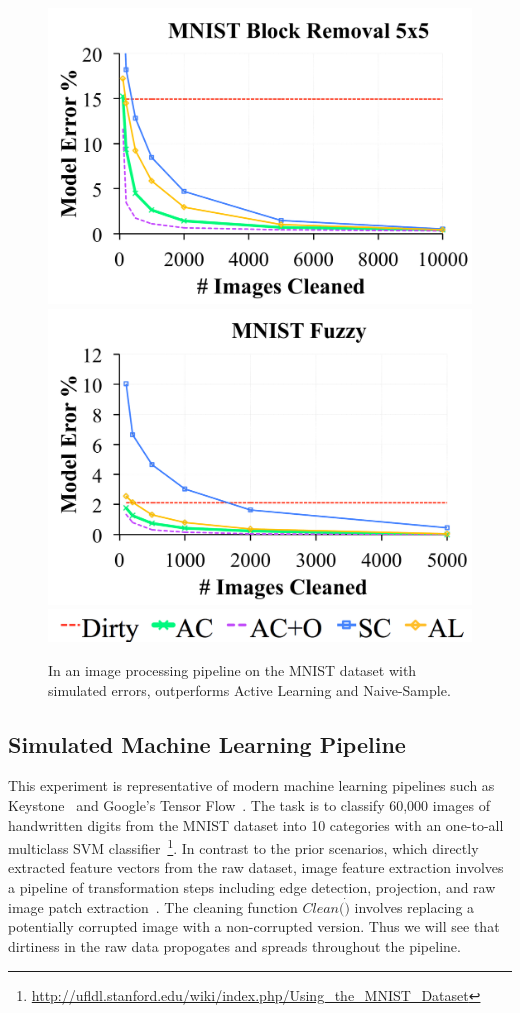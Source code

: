 \begin{figure}[t]
\centering
 \includegraphics[width=0.49\columnwidth]{exp/exp7a.pdf}
 \includegraphics[width=0.49\columnwidth]{exp/exp7b.pdf}
 \includegraphics[width=0.49\columnwidth]{exp/legend-general.png}\vspace{-0.5em}
 \caption{In an image processing pipeline on the MNIST dataset with simulated errors, \sys outperforms Active Learning and Naive-Sample.  \label{mnist}}\vspace{-1em}
\end{figure}

\subsection{Simulated Machine Learning Pipeline}
This experiment is representative of modern machine learning pipelines such as Keystone~\cite{keystone} and Google's Tensor Flow~\cite{tensor}. 
The task is to classify 60,000 images of handwritten digits from the MNIST dataset into 10 categories with an one-to-all multiclass SVM classifier~\footnote{\scriptsize\url{http://ufldl.stanford.edu/wiki/index.php/Using_the_MNIST_Dataset}}. 
In contrast to the prior scenarios, which directly extracted feature vectors from the raw dataset, image feature extraction involves a pipeline of transformation steps including edge detection, projection, and raw image patch extraction~\cite{keystone,tensor}.
The cleaning function $Clean(\dot)$ involves replacing a potentially corrupted image with a non-corrupted version.
Thus we will see that dirtiness in the raw data propogates and spreads throughout the pipeline.


